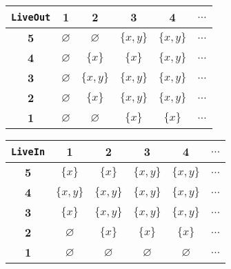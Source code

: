 \begin{minipage}{0.5\textwidth}
    \begin{figure}[H]
        \centering
        \begin{tabular}{|c|c|c|c|c|c|}
            \hline
            \texttt{LiveOut}& \textbf{1} & \textbf{2} & \textbf{3} & \textbf{4} & \textbf{$\dots$} \\
            \hline
            \textbf{5} & $\varnothing$ & $\varnothing$ & $\{x,y\}$ & $\{x,y\}$ & $\dots$ \\
            \hline
            \textbf{4} & $\varnothing$ & $\{x\}$ & $\{x\}$ 
            & $\{x,y\}$ & $\dots$ \\
            \hline
            \textbf{3} & $\varnothing$ &$\{x, y\}$ & $\{x,y\}$ & $\{x,y\}$ & $\dots$ \\
            \hline
            \textbf{2} & $\varnothing$ & $\{x\}$ & $\{x,y\}$  & $\{x,y\}$ & $\dots$ \\
            \hline
            \textbf{1} & $\varnothing$  & $\varnothing$ & $\{x\}$ & $\{x\}$ & $\dots$ \\
            \hline
        \end{tabular}
    \end{figure}
\end{minipage}
\begin{minipage}{0.5\textwidth}
    \begin{figure}[H]
        \centering
        \begin{tabular}{|c|c|c|c|c|c|}
            \hline
            \texttt{LiveIn}& \textbf{1} & \textbf{2} & \textbf{3} & \textbf{4} & \textbf{$\dots$} \\
            \hline
            \textbf{5} & $\{x\}$ & $\{x\}$ & $\{x,y\}$ & $\{x,y\}$ & $\dots$ \\
            \hline
            \textbf{4} & $\{x, y\}$ & $\{x,y\}$ & $\{x,y\}$ 
            & $\{x,y\}$ & $\dots$ \\
            \hline
            \textbf{3} & $\{x\}$ &$\{x,y\}$ & $\{x,y\}$ & $\{x,y\}$ & $\dots$ \\
            \hline
            \textbf{2} & $\varnothing$ & $\{x\}$ & $\{x\}$  & $\{x\}$ & $\dots$ \\
            \hline
            \textbf{1} & $\varnothing$  & $\varnothing$ & $\varnothing$ & $\varnothing$ & $\dots$ \\
            \hline
        \end{tabular}
    \end{figure}
\end{minipage}

